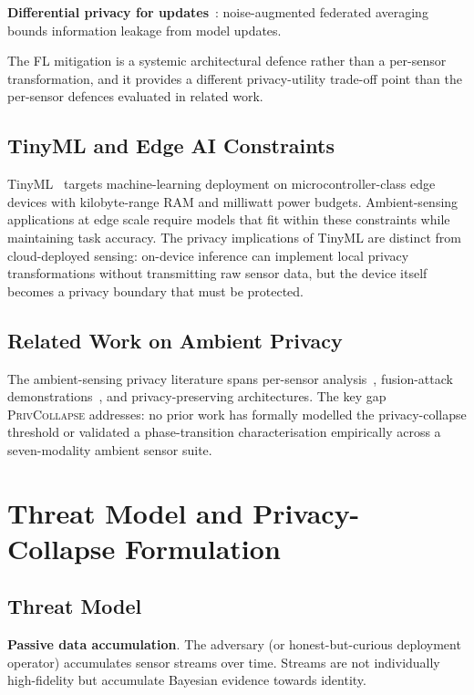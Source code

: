 \documentclass[sigconf,nonacm]{acmart}
\begin{document}
\textbf{Differential privacy for updates}~\cite{abadi2016deep}:
noise-augmented federated averaging bounds information leakage
from model updates.

The FL mitigation is a systemic architectural defence rather
than a per-sensor transformation, and it provides a different
privacy-utility trade-off point than the per-sensor defences
evaluated in related work.

\subsection{TinyML and Edge AI Constraints}

TinyML~\cite{warden2019tinyml,george2025tinyml} targets
machine-learning deployment on microcontroller-class edge
devices with kilobyte-range RAM and milliwatt power budgets.
Ambient-sensing applications at edge scale require models that
fit within these constraints while maintaining task accuracy.
The privacy implications of TinyML are distinct from
cloud-deployed sensing: on-device inference can implement local
privacy transformations without transmitting raw sensor data,
but the device itself becomes a privacy boundary that must be
protected.

\subsection{Related Work on Ambient Privacy}

The ambient-sensing privacy literature spans per-sensor
analysis~\cite{lu2019mid,rizk2025identifi,xie2024tadar},
fusion-attack demonstrations~\cite{zhao2021reidtest,george2025tinyml},
and privacy-preserving architectures. The key gap
\textsc{PrivCollapse} addresses: no prior work has formally
modelled the privacy-collapse threshold or validated a
phase-transition characterisation empirically across a
seven-modality ambient sensor suite.

\section{Threat Model and Privacy-Collapse Formulation}

\subsection{Threat Model}

\textbf{Passive data accumulation}. The adversary (or honest-but-curious
deployment operator) accumulates sensor streams over time.
Streams are not individually high-fidelity but accumulate
Bayesian evidence towards identity.
\end{document}
